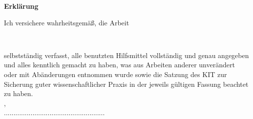 

\begin{center}
{\LARGE {\textbf{Erklärung}}}\\[2.5cm]
\end{center}
Ich versichere wahrheitsgemäß, die Arbeit
\vspace{1cm}
\begin{center}
\large {\titleofthesis}\\
\vspace{1cm}
\end{center}
selbstständig verfasst, alle benutzten Hilfsmittel vollständig und genau angegeben und alles kenntlich gemacht zu haben, was aus Arbeiten anderer unverändert oder mit Abänderungen entnommen wurde sowie die Satzung des KIT zur Sicherung guter wissenschaftlicher Praxis in der jeweils gültigen Fassung beachtet zu haben.\\[2.5cm]
{\city}, {\dateofthesis}\\[0.75cm]
\hspace*{9.0cm}.....................................................\\
\hspace*{10.0cm}\name


